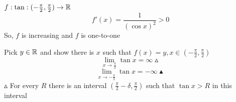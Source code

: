 \begin{example*}[Q10]
  $f: \tan: (-\frac{\pi}{2}, \frac{\pi}{2}) \to \mathbb R$
  $$f'(x) = \frac{1}{(\cos x)^2} > 0$$
  So, $f$ is increasing and $f$ is one-to-one

  Pick $y \in \mathbb R$ and show there is $x$ such that $f(x) = y, x \in \left(-\frac{\pi}{2}, \frac{\pi}{2}\right)$
  $$\lim\limits_{x \to \frac{\pi}{2}} \tan x = \infty \vartriangle$$
  $$\lim\limits_{x \to -\frac{\pi}{2}} \tan x = -\infty \blacktriangle$$
  $\vartriangle$ For every $R$ there is an interval $\left(\frac{\pi}{2} - \delta, \frac{\pi}{2}\right)$ such that 
  $\tan x > R$ in this interval
\end{example*}